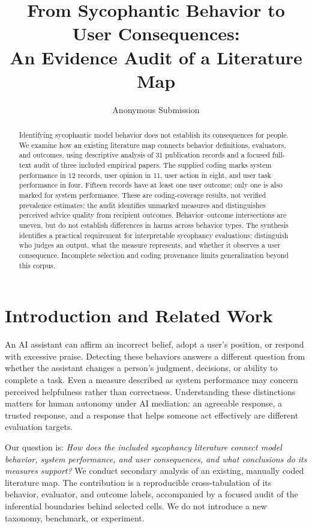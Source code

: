 \documentclass[letterpaper]{article}
\title{From Sycophantic Behavior to User Consequences:\\An Evidence Audit of a Literature Map}
\author{Anonymous Submission}
\begin{document}
\maketitle
\begin{abstract}
Identifying sycophantic model behavior does not establish its consequences for people. We examine how an existing literature map connects behavior definitions, evaluators, and outcomes, using descriptive analysis of 31 publication records and a focused full-text audit of three included empirical papers. The supplied coding marks system performance in 12 records, user opinion in 11, user action in eight, and user task performance in four. Fifteen records have at least one user outcome; only one is also marked for system performance. These are coding-coverage results, not verified prevalence estimates: the audit identifies unmarked measures and distinguishes perceived advice quality from recipient outcomes. Behavior--outcome intersections are uneven, but do not establish differences in harms across behavior types. The synthesis identifies a practical requirement for interpretable sycophancy evaluations: distinguish who judges an output, what the measure represents, and whether it observes a user consequence. Incomplete selection and coding provenance limits generalization beyond this corpus.
\end{abstract}

\section{Introduction and Related Work}
An AI assistant can affirm an incorrect belief, adopt a user's position, or respond with excessive praise. Detecting these behaviors answers a different question from whether the assistant changes a person's judgment, decisions, or ability to complete a task. Even a measure described as system performance may concern perceived helpfulness rather than correctness. Understanding these distinctions matters for human autonomy under AI mediation: an agreeable response, a trusted response, and a response that helps someone act effectively are different evaluation targets.

Our question is: \emph{How does the included sycophancy literature connect model behavior, system performance, and user consequences, and what conclusions do its measures support?} We conduct secondary analysis of an existing, manually coded literature map. The contribution is a reproducible cross-tabulation of its behavior, evaluator, and outcome labels, accompanied by a focused audit of the inferential boundaries behind selected cells. We do not introduce a new taxonomy, benchmark, or experiment.
\end{document}
